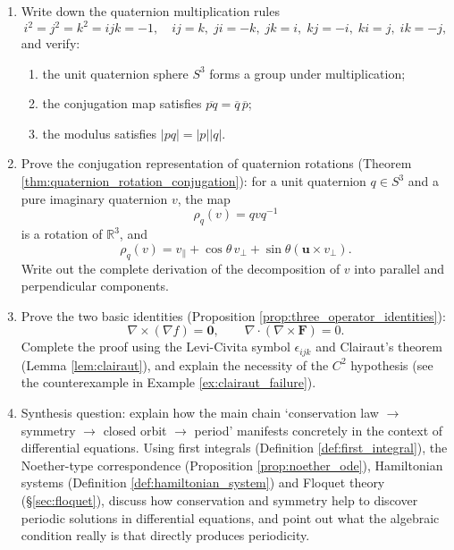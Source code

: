 \begin{enumerate}[leftmargin=3em, label=\textbf{Exercise \arabic*}]
    \item Write down the quaternion multiplication rules
    \[
    i^2=j^2=k^2=ijk=-1,\quad ij=k,\;ji=-k,\;jk=i,\;kj=-i,\;ki=j,\;ik=-j,
    \]
    and verify:
    \begin{enumerate}[label=(\roman*)]
        \item the unit quaternion sphere $S^3$ forms a group under multiplication;
        \item the conjugation map satisfies $\overline{pq}=\overline{q}\,\overline{p}$;
        \item the modulus satisfies $|pq|=|p||q|$.
    \end{enumerate}

    \item Prove the conjugation representation of quaternion rotations (Theorem \ref{thm:quaternion_rotation_conjugation}):
    for a unit quaternion $q\in S^3$ and a pure imaginary quaternion $v$, the map
    \[
    \rho_q(v)=qvq^{-1}
    \]
    is a rotation of $\mathbb{R}^3$, and
    \[
    \rho_q(v)=v_\parallel+\cos\theta\,v_\perp+\sin\theta(\mathbf{u}\times v_\perp).
    \]
    Write out the complete derivation of the decomposition of $v$ into parallel and perpendicular components.

    \item Prove the two basic identities (Proposition \ref{prop:three_operator_identities}):
    \[
    \nabla\times(\nabla f)=\mathbf{0},\qquad
    \nabla\cdot(\nabla\times\mathbf{F})=0.
    \]
    Complete the proof using the Levi-Civita symbol $\epsilon_{ijk}$ and Clairaut's theorem
    (Lemma \ref{lem:clairaut}), and explain the necessity of the $C^2$ hypothesis
    (see the counterexample in Example \ref{ex:clairaut_failure}).

    \item Synthesis question: explain how the main chain `conservation law $\to$ symmetry $\to$ closed orbit $\to$ period'
    manifests concretely in the context of differential equations.
    Using first integrals (Definition \ref{def:first_integral}), the Noether-type correspondence (Proposition \ref{prop:noether_ode}),
    Hamiltonian systems (Definition \ref{def:hamiltonian_system}) and Floquet theory (\S\ref{sec:floquet}),
    discuss how conservation and symmetry help to discover periodic solutions in differential equations,
    and point out what the algebraic condition really is that directly produces periodicity.
\end{enumerate}


